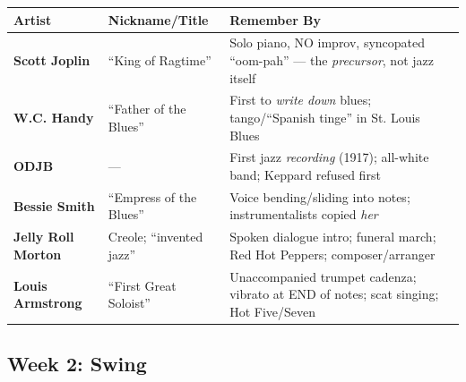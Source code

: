 \documentclass[11pt,letterpaper]{article}
\begin{document}
\renewcommand{\arraystretch}{1.3}
\begin{small}
\begin{tabularx}{\textwidth}{>{\bfseries}p{3cm} p{3.2cm} X}
\toprule
\textbf{Artist} & \textbf{Nickname/Title} & \textbf{Remember By} \\
\midrule
Scott Joplin & ``King of Ragtime'' & Solo piano, NO improv, syncopated ``oom-pah'' --- the \emph{precursor}, not jazz itself \\
W.C. Handy & ``Father of the Blues'' & First to \emph{write down} blues; tango/``Spanish tinge'' in St. Louis Blues \\
ODJB & --- & First jazz \emph{recording} (1917); all-white band; Keppard refused first \\
Bessie Smith & ``Empress of the Blues'' & Voice bending/sliding into notes; instrumentalists copied \emph{her} \\
Jelly Roll Morton & Creole; ``invented jazz'' & Spoken dialogue intro; funeral march; Red Hot Peppers; composer/arranger \\
Louis Armstrong & ``First Great Soloist'' & Unaccompanied trumpet cadenza; vibrato at END of notes; scat singing; Hot Five/Seven \\
\bottomrule
\end{tabularx}
\end{small}

\subsection{\textcolor{week2color}{Week 2: Swing}}
\end{document}
